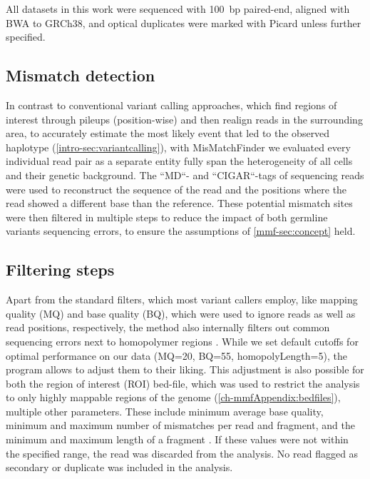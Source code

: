 All datasets in this work were sequenced with 100~bp paired-end, aligned with BWA to GRCh38, and optical duplicates were marked with Picard unless further specified.

\subsection{Mismatch detection}
In contrast to conventional variant calling approaches, which find regions of interest through pileups (position-wise) and then realign reads in the surrounding area, to accurately estimate the most likely event that led to the observed haplotype (\autoref{intro-sec:variantcalling}), with MisMatchFinder we evaluated every individual read pair as a separate entity fully span the heterogeneity of all cells and their genetic background. The ``MD``- and ``CIGAR``-tags of  sequencing reads  were used to reconstruct the sequence of the read and the positions where the read showed a different base than the reference. These potential mismatch sites were then filtered in multiple steps to reduce the impact of both germline variants  sequencing errors, to ensure the assumptions of \autoref{mmf-sec:concept} held.

\subsection{Filtering steps}
Apart from the standard filters, which most variant callers employ, like mapping quality (MQ) and base quality (BQ), which were used to ignore reads as well as read positions, respectively, the method also internally filters out common sequencing errors next to homopolymer regions \cite{Heydari2019}. While we set default cutoffs for optimal performance on our data (MQ=20, BQ=55, homopolyLength=5), the program allows  to adjust them to their liking.
This adjustment is also possible for both the region of interest (ROI) bed-file, which was used to restrict the analysis to only highly mappable regions of the genome (\autoref{ch-mmfAppendix:bedfiles}),  multiple other parameters. These include  minimum average base quality, minimum and maximum number of mismatches per read and fragment, and the minimum and maximum length of a fragment \cite{Hudecova2021}. If  these values were not within the specified range, the read was discarded from the analysis. No read flagged as secondary or duplicate was included in the analysis.

